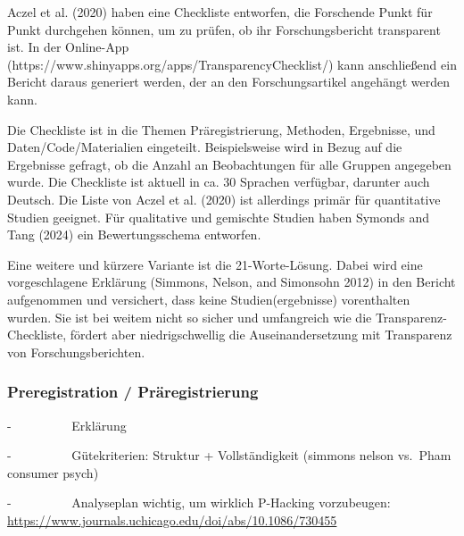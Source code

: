 \documentclass[
  letterpaper,
  DIV=11,
  numbers=noendperiod]{scrreprt}
\begin{document}
\begin{tcolorbox}[enhanced jigsaw, left=2mm, colback=white, colframe=quarto-callout-note-color-frame, opacitybacktitle=0.6, opacityback=0, title=\textcolor{quarto-callout-note-color}{\faInfo}\hspace{0.5em}{Transparenz-Checkliste}, toptitle=1mm, coltitle=black, colbacktitle=quarto-callout-note-color!10!white, titlerule=0mm, bottomtitle=1mm, leftrule=.75mm, breakable, rightrule=.15mm, bottomrule=.15mm, toprule=.15mm, arc=.35mm]

Aczel et al. (2020) haben eine Checkliste entworfen, die Forschende
Punkt für Punkt durchgehen können, um zu prüfen, ob ihr
Forschungsbericht transparent ist. In der Online-App
(https://www.shinyapps.org/apps/TransparencyChecklist/) kann
anschließend ein Bericht daraus generiert werden, der an den
Forschungsartikel angehängt werden kann.

Die Checkliste ist in die Themen Präregistrierung, Methoden, Ergebnisse,
und Daten/Code/Materialien eingeteilt. Beispielsweise wird in Bezug auf
die Ergebnisse gefragt, ob die Anzahl an Beobachtungen für alle Gruppen
angegeben wurde. Die Checkliste ist aktuell in ca. 30 Sprachen
verfügbar, darunter auch Deutsch. Die Liste von Aczel et al. (2020) ist
allerdings primär für quantitative Studien geeignet. Für qualitative und
gemischte Studien haben Symonds and Tang (2024) ein Bewertungsschema
entworfen.

Eine weitere und kürzere Variante ist die 21-Worte-Lösung. Dabei wird
eine vorgeschlagene Erklärung (Simmons, Nelson, and Simonsohn 2012) in
den Bericht aufgenommen und versichert, dass keine Studien(ergebnisse)
vorenthalten wurden. Sie ist bei weitem nicht so sicher und umfangreich
wie die Transparenz-Checkliste, fördert aber niedrigschwellig die
Auseinandersetzung mit Transparenz von Forschungsberichten.

\end{tcolorbox}

\subsubsection{Preregistration /
Präregistrierung}\label{preregistration-pruxe4registrierung}

-~~~~~~~~~ Erklärung

-~~~~~~~~~ Gütekriterien: Struktur + Vollständigkeit (simmons nelson
vs.~Pham consumer psych)

-~~~~~~~~~ Analyseplan wichtig, um wirklich P-Hacking vorzubeugen:
\url{https://www.journals.uchicago.edu/doi/abs/10.1086/730455}
\end{document}
